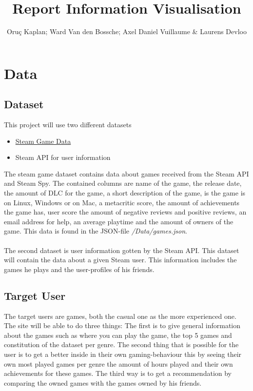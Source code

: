 \documentclass{article}
\begin{document}
	\title{Report Information Visualisation}
	\author{Oruç Kaplan; Ward Van den Bossche; Axel Daniel Vuillaume \& Laurens Devloo}
	\maketitle
	\tableofcontents
	\newpage
	
	\section{Data}
	
	\subsection{Dataset}
	
	This project will use two different datasets
	
	\begin{itemize}
		\item \href{https://www.kaggle.com/datasets/fronkongames/steam-games-dataset/code}{Steam Game Data}
		\item Steam API for user information
	\end{itemize}
	
	The steam game dataset contains data about games received from the Steam API and Steam Spy. The contained columns are name of the game, the release date, the amount of DLC for the game, a short description of the game, is the game is on Linux, Windows or on Mac, a metacritic score, the amount of achievements the game has, user score the amount of negative reviews and positive reviews, an email address for help, an average playtime and the amount of owners of the game. This data is found in the JSON-file \textit{/Data/games.json}.\\
	\\
	The second dataset is user information gotten by the Steam API. This dataset will contain the data about a given Steam user. This information includes the games he plays and the user-profiles of his friends.
	
	\subsection{Target User}
	
	The target users are games, both the casual one as the more experienced one. The site will be able to do three things: The first is to give general information about the games such as where you can play the game, the top 5 games and constitution of the dataset per genre. The second thing that is possible for the user is to get a better inside in their own gaming-behaviour this by seeing their own most played games per genre the amount of hours played and their own achievements for these games. The third way is to get a recommendation by comparing the owned games with the games owned by his friends.
	
\end{document}
